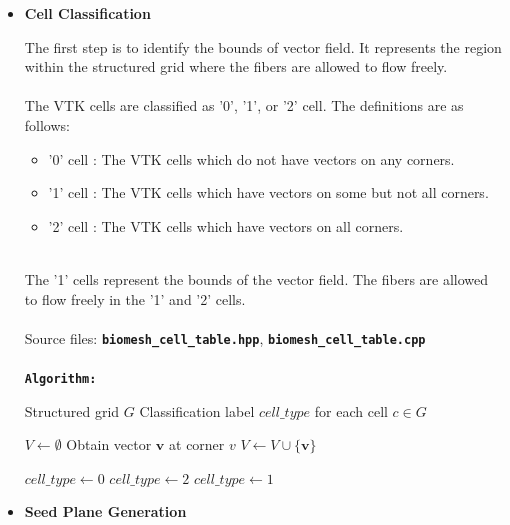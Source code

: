 \documentclass[11pt,a4paper]{article}
\begin{document}
\begin{itemize}

\item \textbf{Cell Classification}

The first step is to identify the bounds of vector field. It represents the region within the structured grid where the fibers are allowed to flow freely.\\
    \\
    The VTK cells are classified as '0', '1', or '2' cell. The definitions are as follows:
    \begin{itemize}
        \item '0' cell : The VTK cells which do not have vectors on any corners.
        \item '1' cell : The VTK cells which have vectors on some but not all corners.
        \item '2' cell : The VTK cells which have vectors on all corners.
    \end{itemize}
    \\
    The '1' cells represent the bounds of the vector field. The fibers are allowed to flow
    freely in the '1' and '2' cells.\\
    \\
    Source files: \texttt{\textbf{biomesh\_cell\_table.hpp}}, \texttt{\textbf{biomesh\_cell\_table.cpp}}\\
    \\
    \texttt{\textbf{Algorithm:}}
\begin{algorithmic}[1]
    \Require Structured grid $G$
    \Ensure Classification label $cell\_type$ for each cell $c \in G$

        \State $V \gets \emptyset$ 
            \State Obtain vector $\mathbf{v}$ at corner $v$
            \State $V \gets V \cup \{\mathbf{v}\}$ 
        \EndFor

            \State $cell\_type \gets 0$ 
            \State $cell\_type \gets 2$ 
        \Else
            \State $cell\_type \gets 1$ 
        \EndIf
    \EndFor
\end{algorithmic}

\item \textbf{Seed Plane Generation}


\end{itemize}
\end{document}
